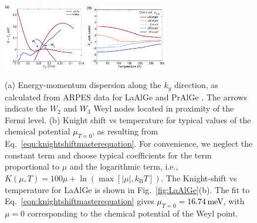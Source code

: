 \documentclass[aps,prb,a4paper,10pt,twocolumn,showpacs,floatfix,superscriptaddress,preprintnumbers,longbibliography]{revtex4-2}
\newcommand{\tcr}[1]{\textcolor{black}{#1}}
\begin{document}
\begin{figure}[!htb]
	\centering 
	\includegraphics[width=0.320\textwidth,angle=0]{figures/PrAlGe/weylpoints}
	\hspace{5mm}
	\includegraphics[width=0.312\textwidth,angle=0]{figures/PrAlGe/weylKS}
	\caption{\label{fig:weylKS}(a) Energy-momentum dispersion along the
	$k_{y}$ direction, as calculated from ARPES data for LaAlGe and
	PrAlGe \cite{xue2017discovery,sanchez2020observation}. 
	The arrows indicate the $W_2$ and $W_3$ Weyl nodes %
	located in proximity of the Fermi level.
	(b) Knight shift vs temperature for typical values of the chemical potential \tcr{$\mu_{T=0}$}, as resulting from Eq.~\eqref{eqn:knightshiftmasterequation}. For convenience, we neglect the constant term and choose typical coefficients for the term proportional to $\mu$ and the logarithmic term, i.e., $K(\mu,T) = 100\mu + \ln\left(\max \left[|\mu|, k_\mathrm{B} T\right]\right)$. 
	The Knight-shift vs temperature for LaAlGe is shown in
	Fig.~\ref{fig:LaAlGe}(b).
	The fit to Eq.~\eqref{eqn:knightshiftmasterequation} %
	gives \tcr{$\mu_{T=0} = 16.74$\,meV}, with $\mu = 0$ corresponding to the
	chemical potential of the Weyl point.
	}
\end{figure}
\end{document}
